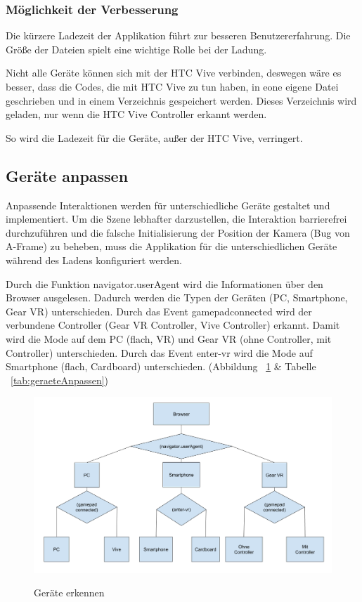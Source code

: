   \subsubsection{Möglichkeit der Verbesserung}
  Die kürzere Ladezeit der Applikation führt zur besseren Benutzererfahrung. Die Größe der Dateien spielt eine wichtige Rolle bei der Ladung.
  
  Nicht alle Geräte können sich mit der HTC Vive verbinden, deswegen wäre es besser, dass die Codes, die mit HTC Vive zu tun haben, in eone eigene Datei geschrieben und in einem Verzeichnis gespeichert werden. Dieses Verzeichnis wird geladen, nur wenn die HTC Vive Controller erkannt werden.
  
  So wird die Ladezeit für die Geräte, außer der HTC Vive, verringert.
  
 \subsection{Geräte anpassen}
 Anpassende Interaktionen werden für unterschiedliche Geräte gestaltet und implementiert. Um die Szene lebhafter darzustellen, die Interaktion barrierefrei durchzuführen und die falsche Initialisierung der Position der Kamera (Bug von A-Frame) zu beheben, muss die Applikation für die unterschiedlichen Geräte während des Ladens konfiguriert werden.
 
 Durch die Funktion {\selectfont navigator.userAgent} wird die Informationen über den Browser ausgelesen. Dadurch werden die Typen der Geräten (PC, Smartphone, Gear VR) unterschieden. Durch das Event {\selectfont gamepadconnected} wird der verbundene Controller (Gear VR Controller, Vive Controller) erkannt. Damit wird die Mode auf dem PC (flach, VR) und Gear VR (ohne Controller, mit Controller) unterschieden. Durch das Event {\selectfont enter-vr} wird die Mode auf Smartphone (flach, Cardboard) unterschieden. (Abbildung ~\ref{fig:geraeteAnpassen} \& Tabelle ~\ref{tab:geraeteAnpassen}) 
 
\begin{figure}[ht]
\vspace*{1em}
\centering
\caption[Geräte erkennen]{Geräte erkennen}
\includegraphics[width=\textwidth]{images/geraeteAnpassen.png}
\label{fig:geraeteAnpassen} 
\end{figure}

